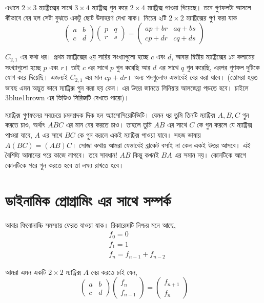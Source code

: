 এখানে $2 \times 3$ ম্যাট্রিক্সের সাথে $3 \times 4$ ম্যাট্রিক্স গুন করে $2 \times 4$ ম্যাট্রিক্স পাওয়া গিয়েছে। তবে গুণফলটা আসলে কীভাবে বের হল সেটা বুঝতে একটু ছোট উদাহরণ দেখা যাক। নিচের ২টি $2 \times 2$ ম্যাট্রিক্সের গুণ করা যাক
 $$
\begin{pmatrix}
a & b \\
c & d
\end{pmatrix}
\begin{pmatrix}
p & q \\
r & s
\end{pmatrix} =
\begin{pmatrix}
ap + br & aq + bs \\
cp + dr & cq + ds
\end{pmatrix}
$$

$C_{2, 1}$ এর কথা ধর। প্রথম ম্যাট্রিক্সের ২য় সারির সংখ্যাগুলো হচ্ছে $c$ এবং $d$, আবার দ্বিতীয় ম্যাট্রিক্সের ১ম কলামের সংখ্যাগুলো হচ্ছে $p$ এবং $r$। তাই $c$ এর সাথে $p$ গুন করেছি আর $d$ এর সাথে $q$ গুন  করেছি, এরপর গুণফল দুটিকে যোগ করে দিয়েছি। এজন্যই $C_{2, 1}$ এর মান $cp + dr$। অন্য পদগুলোও এভাবেই বের করা যাবে। (তোমরা হয়ত ভাবছ এমন অদ্ভুত ভাবে ম্যাট্রিক্স গুন করা হয় কেন। এর উত্তর জানতে লিনিয়ার আলজেব্রা পড়তে হবে। চাইলে 3blue1brown এর ভিডিও সিরিজটি দেখতে পারো)।

ম্যাট্রিক্স গুণফলের সবচেয়ে চমদপ্রদক দিক হল অ্যাসোসিয়েটিভিটি। যেমন ধর তুমি তিনটি ম্যাট্রিক্স $A, B, C$ গুন করতে চাও, অর্থাৎ $ABC$ এর মান বের করতে চাও। তাহলে তুমি $AB$ এর সাথে $C$ কে গুন করলে যে ম্যাট্রিক্স পাওয়া যাবে, $A$ এর সাথে $BC$ কে গুন করলে একই ম্যাট্রিক্স পাওয়া যাবে। সহজ ভাষায় $A(BC) = (AB)C$। সোজা কথায় আমরা যেভাবেই ব্রাকেট বসাই না কেন একই উত্তর আসবে। এই বৈশিষ্ট্য আমাদের পরে কাজে লাগবে। তবে সাবধান! $AB$ কিন্তু কখনই $BA$ এর সমান নয়। কোনটিকে আগে কোনটিকে পরে গুন করতে হবে তা লক্ষ্য রাখতে হবে।

\section{ডাইনামিক প্রোগ্রামিং এর সাথে সম্পর্ক}
আবার ফিবোনাচ্চি সমস্যায় ফেরত যাওয়া যাক। রিকারেন্সটি নিশ্চয় মনে আছে,
\begin{align*}
& f_{0} = 0 \\
& f_{1} = 1 \\
& f_{n} = f_{n - 1} + f_{n - 2}
\end{align*}

আমরা এমন একটি $2 \times 2$ ম্যাট্রিক্স $A$ বের করতে চাই যেন,
$$
\begin{pmatrix}
a & b \\
c & d
\end{pmatrix}
\begin{pmatrix}
f_{n} \\
f_{n - 1}
\end{pmatrix}
=
\begin{pmatrix}
f_{n + 1} \\
f_{n}
\end{pmatrix}
$$


